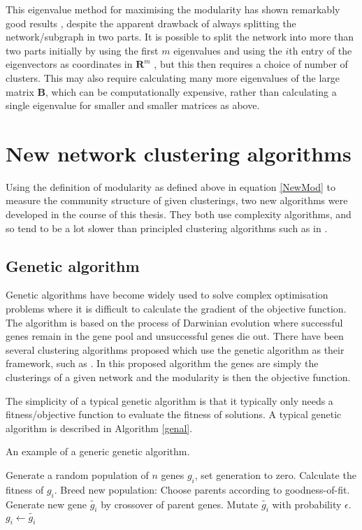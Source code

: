 This eigenvalue method for maximising the modularity has shown
remarkably good results \citep{Newman2006a}, despite the apparent drawback of always splitting the 
network/subgraph in two parts.  It is possible to split the network into more than two parts initially by using the first $m$ 
eigenvalues and using the $i$th entry of the eigenvectors as coordinates in 
$\mathbf{R}^{m}$ \citep{Humphries2011a}, but this then requires a choice of 
number of clusters.  This may also 
require calculating many more eigenvalues of the large matrix $\mathbf{B}$, 
which can be computationally expensive, rather than calculating a single eigenvalue for smaller and smaller matrices as above.  


\section{New network clustering algorithms}
Using the definition of modularity as defined above in equation \ref{NewMod} to measure the community structure of given clusterings, two new algorithms were developed in the course of this thesis.  They both use complexity algorithms, and so tend to be a lot slower than principled clustering algorithms such as in \citep{Newman2006a} \citep{NewmanGirvan2004a}.

\subsection{Genetic algorithm}
Genetic algorithms have become widely used to solve complex optimisation problems where it is difficult to calculate the gradient of the objective function.  The algorithm is based on the process of Darwinian evolution where successful genes remain in the gene pool and unsuccessful genes die out.  There have been several clustering algorithms proposed which use the genetic algorithm as their framework, such as \citep{Pizzuti2008a}. In this proposed algorithm the genes are simply the clusterings of a given network and the modularity is then the objective function.

The simplicity of a typical genetic algorithm is that it typically only needs a fitness/objective function to evaluate the fitness of solutions.  A typical genetic algorithm is described in Algorithm \ref{genal}.

\begin{algorithm}
\caption{An example of a generic genetic algorithm.}
\label{genal}
\begin{algorithmic}
\STATE Generate a random population of $n$ genes $g_i$, set generation to zero.
\STATE Calculate the fitness of $g_i$.
\ENDFOR
\STATE Breed new population:
\STATE Choose parents according to goodness-of-fit.
\STATE Generate new gene $\tilde{g_i}$ by crossover of parent genes.
\STATE Mutate $\tilde{g_i}$ with probability $\epsilon$.
\ENDFOR
{} \STATE $g_i \leftarrow \tilde{g_i}$ \ENDFOR
\ENDWHILE
\end{algorithmic}
\end{algorithm}

